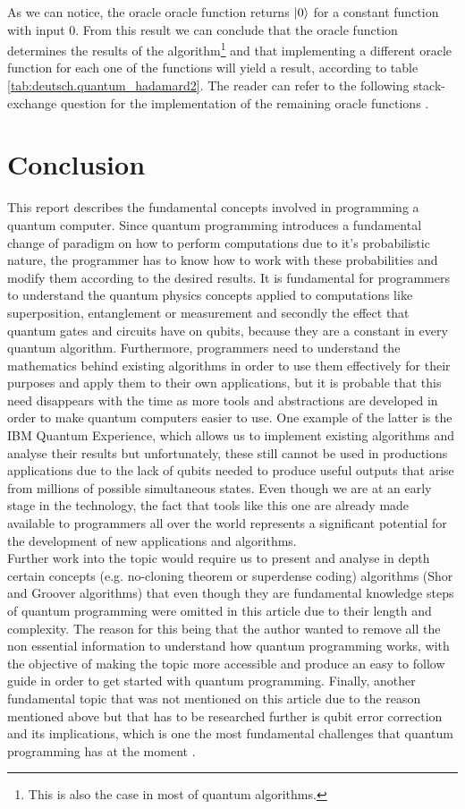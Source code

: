 \documentclass[12pt,a4paper]{scrartcl}
\begin{document}
As we can notice, the oracle oracle function returns $\ket{0}$ for a constant function with input 0. From this result we can conclude that the oracle function determines the results of the algorithm\footnote{This is also the case in most of quantum algorithms.} and that implementing a different oracle function for each one of the functions will yield a result, according to table \ref{tab:deutsch.quantum_hadamard2}. The reader can refer to the following stack-exchange question for the implementation of the remaining oracle functions \cite{veseli2020}.


\section{Conclusion}
This report describes the fundamental concepts involved in programming a quantum computer. Since quantum programming introduces a fundamental change of paradigm on how to perform computations due to it's probabilistic nature, the programmer has to know how to work with these probabilities and modify them according to the desired results. It is fundamental for programmers to understand the quantum physics concepts applied to computations like superposition, entanglement or measurement and secondly the effect that quantum gates and circuits have on qubits, because they are a constant in every quantum algorithm. Furthermore, programmers need to understand the mathematics behind existing algorithms in order to use them effectively for their purposes and apply them to their own applications, but it is probable that this need disappears with the time as more tools and abstractions are developed in order to make quantum computers easier to use. One example of the latter is the IBM Quantum Experience, which allows us to implement existing algorithms and analyse their results but unfortunately, these still cannot be used in productions applications due to the lack of qubits needed to produce useful outputs that arise from millions of possible simultaneous states. Even though we are at an early stage in the technology, the fact that tools like this one are already made available to programmers all over the world represents a significant potential for the development of new applications and algorithms.\\
Further work into the topic would require us to present and analyse in depth certain concepts (e.g. no-cloning theorem or superdense coding) algorithms (Shor and Groover algorithms) that even though they are fundamental knowledge steps of quantum programming were omitted in this article due to their length and complexity. The reason for this being that the author wanted to remove all the non essential information to understand how quantum programming works, with the objective of making the topic more accessible and produce an easy to follow guide in order to get started with quantum programming. Finally, another fundamental topic that was not mentioned on this article due to the reason mentioned above but that has to be researched further is qubit error correction and its implications, which is one the most fundamental challenges that quantum programming has at the moment \cite{bernhardt2019quantum}.
\end{document}
